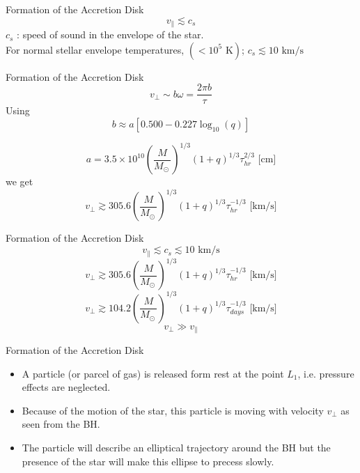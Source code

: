 \documentclass{beamer}
\begin{document}
\begin{darkframes}

\begin{frame}{Formation of the Accretion Disk}
	\[v_\parallel \lesssim c_s \]
	\pause
	$c_s$ : speed of sound in the envelope of the star.\\
	\pause
	For normal stellar envelope temperatures, $(<10^5 \textrm{ K}) $;
	\pause
	$c_s \lesssim 10 \textrm{ km/s}$
\end{frame}

\begin{frame}{Formation of the Accretion Disk}
	\[v_\perp \sim b\omega = \frac{2\pi b}{\tau} \]
	\pause
	Using
	\[ b \approx a \left[ 0.500 - 0.227 \log_10 \left( q \right) \right] \]

	\[ a = 3.5 \times 10^{10} \left( \frac{M}{M_{\odot\ }} \right)^{1/3} \left(1+q\right)^{1/3} \tau_{hr}^{2/3} \textrm{ [cm]} \]
	\pause
	we get
	\[v_\perp \gtrsim 305.6 \left( \frac{M}{M_{\odot\ }} \right)^{1/3} \left(1+q\right)^{1/3} \tau_{hr}^{-1/3} \textrm{ [km/s]}\]
\end{frame}

\begin{frame}{Formation of the Accretion Disk}
	\[v_\parallel \lesssim c_s \lesssim 10 \textrm{ km/s} \]
	\[v_\perp \gtrsim 305.6 \left( \frac{M}{M_{\odot\ }} \right)^{1/3} \left(1+q\right)^{1/3} \tau_{hr}^{-1/3} \textrm{ [km/s]}\]
	\pause
	\[v_\perp \gtrsim 104.2 \left( \frac{M}{M_{\odot\ }} \right)^{1/3} \left(1+q\right)^{1/3} \tau_{days}^{-1/3} \textrm{ [km/s]}\]
	\pause 
	\[v_\perp \gg v_\parallel \]
\end{frame}

\begin{frame}{Formation of the Accretion Disk}
	\begin{itemize}
	\item A particle (or parcel of gas) is released form rest at the point $L_1$, i.e. pressure effects are neglected.
	\pause
	\item Because of the motion of the star, this particle is moving with velocity $v_\perp $ as seen from the BH.
	\pause
	\item The particle will describe an elliptical trajectory around the BH but the presence of the star will make this ellipse to precess slowly.
	\end{itemize}
\end{frame}


\end{darkframes}
\end{document}
